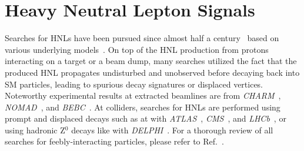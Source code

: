 \documentclass[
    aps,
    prd,
    reprint,
    amsmath,
    amssymb,
    nofootinbib,
    superscriptaddress,
    floatfix
]{revtex4-2}
\begin{document}

\section{\label{sec:hnl_signals}Heavy Neutral Lepton Signals}

Searches for HNLs have been pursued since almost half a century~\cite{Abdullahi:2022jlv} based on various underlying models~\cite{Fernandez-Martinez:2023phj}. On top of the HNL production from protons interacting on a target or a beam dump, many searches utilized the fact that the produced HNL propagates undisturbed and unobserved before decaying back into SM particles, leading to spurious decay signatures or displaced vertices. Noteworthy experimental results at extracted beamlines are from \textit{CHARM}~\cite{CHARM:1983ayi, Orloff:2002de, Boiarska:2021yho}, \textit{NOMAD}~\cite{NOMAD:2001eyx}, and \textit{BEBC}~\cite{Barouki:2022bkt, BEBC_OG_COOPERSARKAR1985207}. At colliders, searches for HNLs are performed using prompt and displaced decays such as at with \textit{ATLAS}~\cite{ATLAS:2019kpx, atlas_2022_HNL_PhysRevLett.131.061803}, \textit{CMS}~\cite{CMS:2018iaf, CMS:2022fut}, and \textit{LHCb}~\cite{LHCb:2020wxx}, or using hadronic Z$^0$ decays like with \textit{DELPHI}~\cite{DELPHI:1996qcc}. For a thorough review of all searches for feebly-interacting particles, please refer to Ref.~\cite{Agrawal:2021dbo}.
\end{document}
